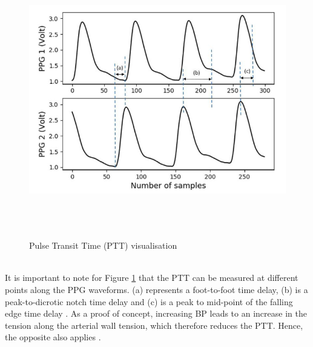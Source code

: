 \documentclass[11pt, a4paper]{article}
\begin{document}
\begin{figure}[H]
    \centering
    \includegraphics[width=12cm,height=12cm,keepaspectratio]{Figures/ptt.png}
    \caption{Pulse Transit Time (PTT) visualisation \cite{ElHajj2020}}
    \label{ptt}
\end{figure} \\ \newline \noindent It is important to note for Figure \ref{ptt} that the PTT can be measured at different points along the PPG waveforms. (a) represents a foot-to-foot time delay, (b) is a peak-to-dicrotic notch time delay and (c) is a peak to mid-point of the falling edge time delay \cite{ElHajj2020}. As a proof of concept, increasing BP leads to an increase in the tension along the arterial wall tension, which therefore reduces the PTT. Hence, the opposite also applies \cite{Kumar2015}.
\end{document}

